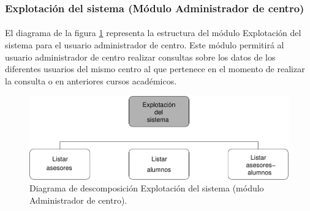 \subsubsection{Explotación del sistema (Módulo Administrador de centro)}

  \paragraph{}El diagrama de la figura
  \ref{diagramaDescomposicionExplotacionSistema-admCentro} representa la
  estructura del módulo Explotación del sistema para el usuario administrador
  de centro. Este módulo permitirá al usuario administrador de centro realizar
  consultas sobre los datos de los diferentes usuarios del mismo centro
  al que pertenece en el momento de realizar la consulta o en anteriores cursos
  académicos.

  \begin{figure}[!ht]
    \begin{center}
      \includegraphics[]{11.Disenyo_Arquitectonico/11.2.Diagramas_Descomposicion/11.2.3.Modulo_administrador_centro/ExplotacionSistema/Diagramas/explotacion_sistema.pdf}
      \caption{Diagrama de descomposición Explotación del sistema (módulo Administrador de centro).}
      \label{diagramaDescomposicionExplotacionSistema-admCentro}
    \end{center}
  \end{figure}